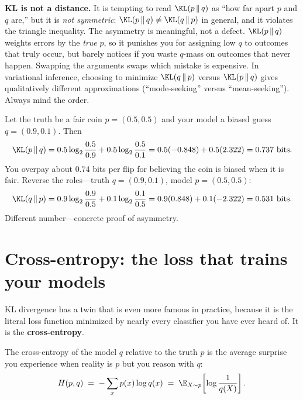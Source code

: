 \begin{trapbox}
\textbf{KL is not a distance.} It is tempting to read $\KL(p\,\|\,q)$ as ``how far apart $p$ and $q$ are,''
but it is \emph{not symmetric}: $\KL(p\,\|\,q) \ne \KL(q\,\|\,p)$ in general, and it violates the triangle
inequality. The asymmetry is meaningful, not a defect. $\KL(p\,\|\,q)$ weights errors by the \emph{true}
$p$, so it punishes you for assigning low $q$ to outcomes that truly occur, but barely notices if you waste
$q$-mass on outcomes that never happen. Swapping the arguments swaps which mistake is expensive. In
variational inference, choosing to minimize $\KL(q\,\|\,p)$ versus $\KL(p\,\|\,q)$ gives qualitatively
different approximations (``mode-seeking'' versus ``mean-seeking''). Always mind the order.
\end{trapbox}

\begin{example}
\label{ch33:kl-coins}
Let the truth be a fair coin $p = (0.5, 0.5)$ and your model a biased guess $q = (0.9, 0.1)$. Then
\[
  \KL(p\,\|\,q) = 0.5\log_2\frac{0.5}{0.9} + 0.5\log_2\frac{0.5}{0.1}
               = 0.5(-0.848) + 0.5(2.322) = 0.737 \text{ bits.}
\]
You overpay about $0.74$ bits per flip for believing the coin is biased when it is fair. Reverse the
roles---truth $q = (0.9,0.1)$, model $p = (0.5,0.5)$:
\[
  \KL(q\,\|\,p) = 0.9\log_2\frac{0.9}{0.5} + 0.1\log_2\frac{0.1}{0.5}
               = 0.9(0.848) + 0.1(-2.322) = 0.531 \text{ bits.}
\]
Different number---concrete proof of asymmetry.
\end{example}

\section{Cross-entropy: the loss that trains your models}
\label{ch33:cross-entropy}

KL divergence has a twin that is even more famous in practice, because it is the literal loss function
minimized by nearly every classifier you have ever heard of. It is the \textbf{cross-entropy}.

\begin{definition}
\label{ch33:def-cross-entropy}
The cross-entropy of the model $q$ relative to the truth $p$ is the average surprise you experience when
reality is $p$ but you reason with $q$:
\[
  H(p, q) \;=\; -\sum_x p(x)\log q(x) \;=\; \E_{X\sim p}\!\left[\log\frac{1}{q(X)}\right].
\]
\end{definition}

